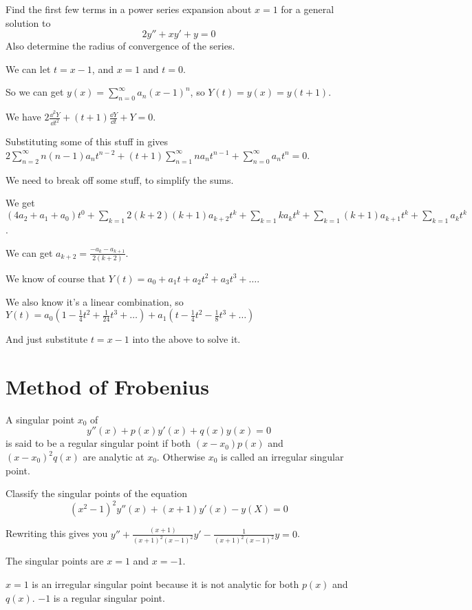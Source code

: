 \documentclass[../diffeq.tex]{subfiles}
\begin{document}
\pagebreak
\begin{example}
    Find the first few terms in a power series expansion about $x=1$ for a general solution to 
    \[ 2y''+xy'+y=0 \]
    Also determine the radius of convergence of the series.

    We can let $t=x-1$, and $x=1$ and $t=0$.

    So we can get $y(x)=\sum_{n=0}^{\infty} a_n(x-1)^n$, so $Y(t)=y(x)=y(t+1)$.

    We have $2\frac{\dd^2 Y}{\dd t^2}+(t+1)\frac{\dd Y}{\dd t}+Y =0$.

    Substituting some of this stuff in gives $2\sum_{n=2}^{\infty}n(n-1)a_nt^{n-2}+(t+1)\sum_{n=1}^{\infty}na_nt^{n-1}+\sum_{n=0}^{\infty}a_nt^n=0$.

    We need to break off some stuff, to simplify the sums.

    We get $(4a_2+a_1+a_0)t^0+\sum_{k=1}2(k+2)(k+1)a_{k+2}t^k + \sum_{k=1}ka_kt^k + \sum_{k=1}(k+1)a_{k+1}t^k + \sum_{k=1}a_k t^k$.

    We can get $a_{k+2}=\frac{-a_k-a_{k+1}}{2(k+2)}$.

    We know of course that $Y(t)=a_0+a_1t+a_2t^2+a_3t^3+\dots$.

    We also know it's a linear combination, so $Y(t)=a_0(1-\frac{1}{4}t^2+\frac{1}{24}t^3+\dots)+a_1(t-\frac{1}{4}t^2-\frac{1}{8}t^3+\dots)$

    And just substitute $t=x-1$ into the above to solve it.
\end{example}

\section{Method of Frobenius}
\begin{definition}
    A singular point $x_0$ of 
    \[ y''(x)+p(x)y'(x)+q(x)y(x)=0\]
    is said to be a regular singular point if both $(x-x_0)p(x)$ and $(x-x_0)^2q(x)$ are analytic at $x_0$. Otherwise $x_0$ is called an irregular singular point.
\end{definition}

\begin{example}
    Classify the singular points of the equation 
    \[ (x^2-1)^2 y''(x)+(x+1)y'(x)-y(X)=0 \]

    Rewriting this gives you $y''+\frac{(x+1)}{(x+1)^2(x-1)^2}y'-\frac{1}{(x+1)^2(x-1)^2}y=0$.

    The singular points are $x=1$ and $x=-1$.

    $x=1$ is an irregular singular point because it is not analytic for both $p(x)$ and $q(x)$. $-1$ is a regular singular point.
\end{example}
\end{document}
